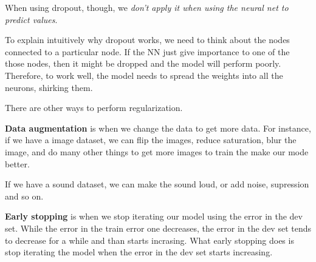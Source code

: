 \documentclass[12pt, a4paper, oneside]{book}
\begin{document}
When using dropout, though, we \textit{don't apply it when using the neural net
to predict values}.

To explain intuitively why dropout works, we need to think about the nodes
connected to a particular node. If the NN just give importance to one of the
those nodes, then it might be dropped and the model will perform poorly.
Therefore, to work well, the model needs to spread the weights into all the
neurons, shirking them.

There are other ways to perform regularization.

\textbf{Data augmentation} is when we change the data to get more data. For
instance, if we have a image dataset, we can flip the images, reduce saturation,
blur the image, and do many other things to get more images to train the make
our mode better.

If we have a sound dataset, we can make the sound loud, or add noise, supression
and so on.

\textbf{Early stopping} is when we stop iterating our model using the error in
the dev set. While the error in the train error one decreases, the error in the
dev set tends to decrease for a while and than starts incrasing. What early
stopping does is stop iterating the model when the error in the dev set starts
increasing.

\end{document}
